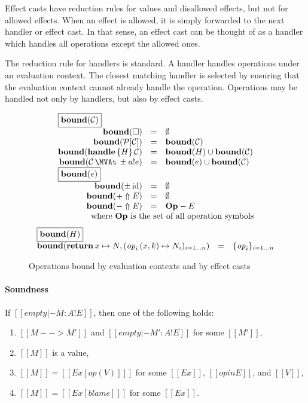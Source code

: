 Effect casts have reduction rules for values and disallowed effects,
but not for allowed effects. When an effect is allowed, it is simply
forwarded to the next handler or effect cast. In that sense,
an effect cast can be thought of as a handler which handles all operations
except the allowed ones.

The reduction rule for handlers is standard. A handler handles operations under an
evaluation context. The closest matching handler is selected by ensuring that
the evaluation context cannot already handle the operation.
Operations may be handled not only by handlers, but also by effect casts.



\begin{figure}
\[
\begin{array}{rcl}
\multicolumn{3}{l}{\fbox{$\bound{\xC}$}} \\
  \bound{\square} & = & \emptyset \\
  \bound{\context{\xP}{\xC}} & = & \bound{\xC} \\
  \bound{\handle{H}{\xC}} & = & \bound{H} \cup \bound{\xC} \\
  \bound{\cast{\xC}{\pm \cty{e}{a}}} & = & \bound{e} \cup \bound{\xC} \\
\multicolumn{3}{l}{\fbox{$\bound{e}$}} \\
  \bound{\pm\, \cid} & = & \emptyset \\
  \bound{+ \Uparrow E} & = & \emptyset \\
  \bound{- \Uparrow E} & = & \mathbf{Op} - E \\
  && \quad \makebox[0pt]{\text{where $\mathbf{Op}$ is the set of all operation symbols} }
\end{array}
\]
\[
\begin{array}{rcl}
\multicolumn{3}{l}{\fbox{$\bound{H}$}} \\
  \bound{\treturn{x}\mapsto N, \fori{i}{n}{\perform{\effop_i}{x,k} \mapsto N_i}}
    &=& \foriset{i}{n}{\effop_i}
\end{array}
\]
\caption{Operations bound by evaluation contexts and by effect casts}
\end{figure}

\paragraph{Soundness} If $[[empty |- M : A ! E]]$, then one of the following holds:
\begin{enumerate}
 \item $[[M --> M']]$ and $[[empty |- M' : A ! E]]$ for some $[[M']]$,
 \item $[[M]]$ is a value,
 \item $[[M]] = [[Ex [ op ( V ) ] ]]$ for some $[[Ex]]$, $[[op in E]]$, and $[[V]]$,
 \item $[[M]] = [[Ex [ blame ] ]]$ for some $[[Ex]]$.
\end{enumerate}

